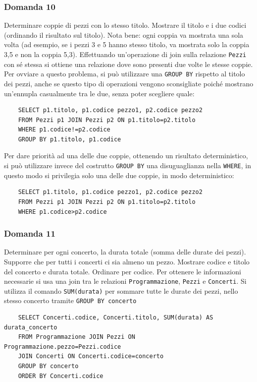 \documentclass{article}
\begin{document}
\subsubsection*{Domanda 10}
Determinare coppie di pezzi con lo stesso titolo. Mostrare il titolo e i due codici (ordinando il risultato sul titolo). Nota bene: ogni coppia va mostrata una sola volta 
(ad esempio, se i pezzi 3 e 5 hanno stesso titolo, va mostrata solo la coppia 3,5 e non la coppia 5,3). Effettuando un'operazione di join sulla relazione \verb|Pezzi| con sé stessa si ottiene una relazione dove sono 
presenti due volte le stesse coppie. Per ovviare a questo problema, si può utilizzare una \verb|GROUP BY| rispetto al titolo dei pezzi, anche se questo tipo di operazioni vengono sconsigliate poiché mostrano 
un'ennupla casualmente tra le due, senza poter scegliere quale:
\begin{verbatim}
    SELECT p1.titolo, p1.codice pezzo1, p2.codice pezzo2
    FROM Pezzi p1 JOIN Pezzi p2 ON p1.titolo=p2.titolo
    WHERE p1.codice!=p2.codice
    GROUP BY p1.titolo, p1.codice
\end{verbatim}

Per dare priorità ad una delle due coppie, ottenendo un risultato deterministico, si può utilizzare invece del costrutto \verb|GROUP BY| una 
disuguaglianza nella \verb|WHERE|, in questo modo si privilegia solo una delle due coppie, in modo deterministico:
\begin{verbatim}
    SELECT p1.titolo, p1.codice pezzo1, p2.codice pezzo2
    FROM Pezzi p1 JOIN Pezzi p2 ON p1.titolo=p2.titolo
    WHERE p1.codice>p2.codice
\end{verbatim}

\subsubsection*{Domanda 11}
Determinare per ogni concerto, la durata totale (somma delle durate dei pezzi). Supporre che per tutti i concerti ci sia almeno un pezzo. Mostrare codice e titolo del concerto e durata totale. Ordinare per codice. 
Per ottenere le informazioni necessarie si usa una join tra le relazioni \verb|Programmazione|, \verb|Pezzi| e \verb|Concerti|. Si utilizza il comando \verb|SUM(durata)| per sommare tutte le durate dei pezzi, nello 
stesso concerto tramite \verb|GROUP BY concerto|  
\begin{verbatim}
    SELECT Concerti.codice, Concerti.titolo, SUM(durata) AS durata_concerto
    FROM Programmazione JOIN Pezzi ON Programmazione.pezzo=Pezzi.codice
    JOIN Concerti ON Concerti.codice=concerto
    GROUP BY concerto
    ORDER BY Concerti.codice
\end{verbatim}
\end{document}
